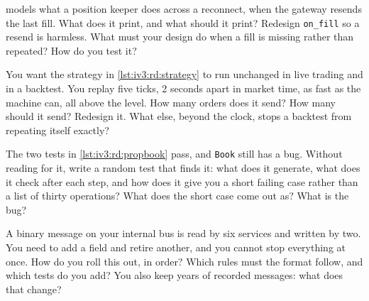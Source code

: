 \begin{question}\label{iq:iv3:reading-debugging-and-software-design:35}
 models what a position keeper does across a reconnect, when the gateway resends the last fill. What does it print, and what should it print? Redesign \texttt{on\_fill} so a resend is harmless. What must your design do when a fill is missing rather than repeated? How do you test it?
\label{lst:iv3:rd:replay}
\end{question}

\begin{question}\label{iq:iv3:reading-debugging-and-software-design:36}
You want the strategy in \cref{lst:iv3:rd:strategy} to run unchanged in live trading and in a backtest. You replay five ticks, 2 seconds apart in market time, as fast as the machine can, all above the level. How many orders does it send? How many should it send? Redesign it. What else, beyond the clock, stops a backtest from repeating itself exactly?
\label{lst:iv3:rd:strategy}
\end{question}

\begin{question}\label{iq:iv3:reading-debugging-and-software-design:37}
The two tests in \cref{lst:iv3:rd:propbook} pass, and \texttt{Book} still has a bug. Without reading for it, write a random test that finds it: what does it generate, what does it check after each step, and how does it give you a short failing case rather than a list of thirty operations? What does the short case come out as? What is the bug?
\label{lst:iv3:rd:propbook}
\end{question}

\begin{question}\label{iq:iv3:reading-debugging-and-software-design:38}
A binary message on your internal bus is read by six services and written by two. You need to add a field and retire another, and you cannot stop everything at once. How do you roll this out, in order? Which rules must the format follow, and which tests do you add? You also keep years of recorded messages: what does that change?
\end{question}

